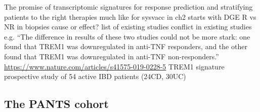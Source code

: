 \begin{outline}
\1 The promise of transcriptomic signatures for response prediction and stratifying patients to the right therapies
    \2 much like for sysvacc in ch2
    \2 starts with DGE R vs NR in biopsies
    \2 cause or effect?
    \2 list of existing studies
    \2 conflict in existing studies e.g. \enquote{The difference in results of these two studies could not be more stark: one found that TREM1 was downregulated in anti-TNF responders, and the other found that TREM1 was downregulated in anti-TNF non-responders.} \url{https://www.nature.com/articles/s41575-019-0228-5}
    \2 TREM1 signature \autocite{verstockt2019LowTREM1Expression}
        \2 prospective study of 54 active IBD patients (24CD, 30UC)

\subsection{The PANTS cohort}


\end{outline}
